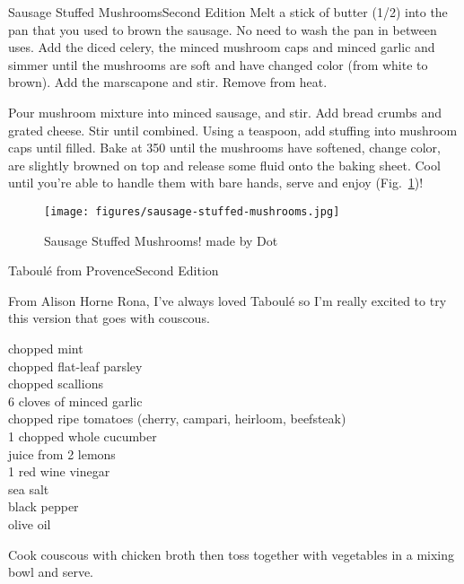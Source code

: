 \begin{entry}{Sausage Stuffed Mushrooms}{Second Edition}
Melt a stick of butter (\SI{1/2}{\cup}) into the pan that you used to brown the
sausage. No need to wash the pan in between uses. Add the diced celery, the
minced mushroom caps and minced garlic and simmer until the mushrooms are soft
and have changed color (from white to brown). Add the marscapone and stir.
Remove from heat.

Pour mushroom mixture into minced sausage, and stir. Add bread crumbs and grated
cheese. Stir until combined. Using a teaspoon, add stuffing into mushroom caps
until filled. Bake at \SI{350}{\degreeF} until the mushrooms have softened,
change color, are slightly browned on top and release some fluid onto the baking
sheet. Cool until you're able to handle them with bare hands, serve and enjoy (Fig.~\ref{fig:sausage-stuffed-mushrooms})!
\begin{figure}
    \centering
    \texttt{[image: figures/sausage-stuffed-mushrooms.jpg]}
    \caption{Sausage Stuffed Mushrooms! made by Dot}
    \label{fig:sausage-stuffed-mushrooms}
\end{figure}
\end{entry}

\begin{entry}{Taboul\'{e} from Provence}{Second Edition}

\begin{open}
  From Alison Horne Rona, I've always loved Taboul\'{e} so I'm really excited to try
  this version that goes with couscous.
\end{open}
\begin{ingredients}
    chopped mint\\
    chopped flat-leaf parsley\\
    chopped scallions\\
    6 cloves of minced garlic\\
    chopped ripe tomatoes (cherry, campari, heirloom, beefsteak)\\
    1 chopped whole cucumber\\
    juice from 2 lemons\\
    \SI{1}{\tblspoon} red wine vinegar\\
    sea salt\\
    black pepper\\
    olive oil
\end{ingredients}
Cook couscous with chicken broth then toss together with vegetables in a
mixing bowl and serve.
\end{entry}


